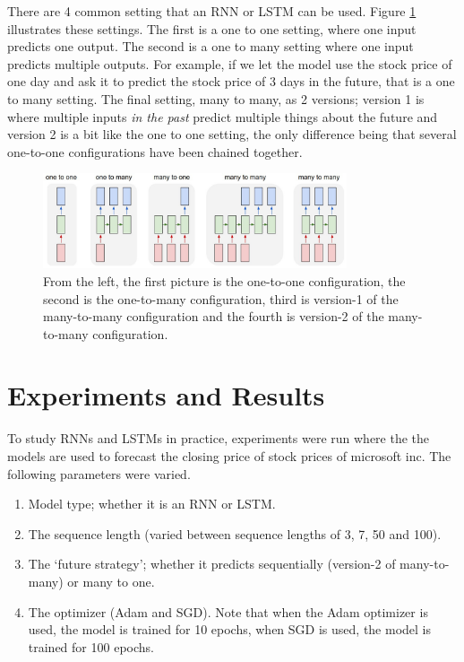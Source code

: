 \documentclass[12pt, letterpaper]{article}
\begin{document}
There are 4 common setting that an RNN or LSTM can be used. Figure \ref{fig: RNN/LSTM configs}
illustrates these settings. The first is a one to one setting, where one input predicts one output. 
The second is a one to many setting where one input predicts multiple outputs. For example, if we let 
the model use the stock price of one day and ask it to predict the stock price of 3 days in the future,
that is a one to many setting. The final setting, many to many, as 2 versions; version 1 is where 
multiple inputs \textit{in the past} predict multiple things about the future and version 2 is 
a bit like the one to one setting, the only difference being that several one-to-one configurations
have been chained together. 

\begin{figure}[htpb]
    \centering
    \includegraphics[width=0.8\textwidth]{rnn configurations.jpeg}
    \caption{From the left, the first picture is the one-to-one configuration, 
    the second is the one-to-many configuration, third is version-1 of the many-to-many
    configuration and the fourth is version-2 of the many-to-many configuration.}
    \label{fig: RNN/LSTM configs}
\end{figure}

\section{Experiments and Results}

To study RNNs and LSTMs in practice, experiments were run where the the models are used to forecast the closing price of stock prices of microsoft inc.
The following parameters were varied.

\begin{enumerate}
    \item Model type; whether it is an RNN or LSTM.
    \item The sequence length (varied between sequence lengths of 3, 7, 50 and 100).
    \item The `future strategy'; whether it predicts sequentially (version-2 of many-to-many) or many to one.
    \item The optimizer (Adam and SGD). Note that when the Adam optimizer is used, the model 
    is trained for 10 epochs, when SGD is used, the model is trained for 100 epochs.
\end{enumerate}
\end{document}

